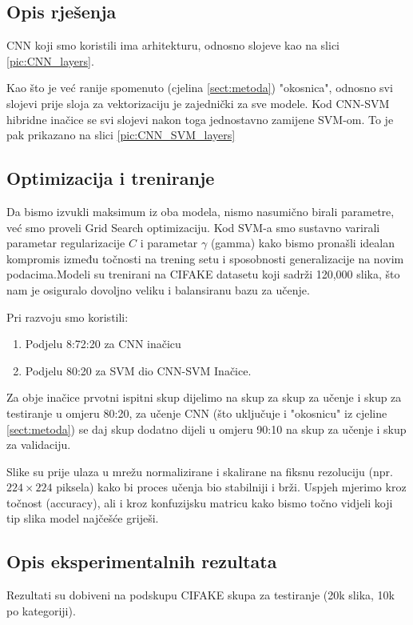 \documentclass[conference]{IEEEtran}
\begin{document}
\subsection{Opis rješenja}
CNN koji smo koristili ima arhitekturu, odnosno slojeve kao na slici \ref{pic:CNN_layers}.


Kao što je već ranije spomenuto (cjelina \ref{sect:metoda}) "okosnica", odnosno svi slojevi prije sloja za vektorizaciju je zajednički za sve modele. Kod CNN-SVM hibridne inačice se svi slojevi nakon toga jednostavno zamijene SVM-om. To je pak prikazano na slici \ref{pic:CNN_SVM_layers}

\subsection{Optimizacija i treniranje}Da bismo izvukli maksimum iz oba modela, nismo nasumično birali parametre, već smo proveli Grid Search optimizaciju. Kod SVM-a smo sustavno varirali parametar regularizacije $C$ i parametar $\gamma$ (gamma) kako bismo pronašli idealan kompromis između točnosti na trening setu i sposobnosti generalizacije na novim podacima.Modeli su trenirani na CIFAKE datasetu koji sadrži 120,000 slika, što nam je osiguralo dovoljno veliku i balansiranu bazu za učenje. 

Pri razvoju smo koristili:
\begin{enumerate}
\item Podjelu 8:72:20 za CNN inačicu
\item Podjelu 80:20 za SVM dio CNN-SVM Inačice.
\end{enumerate}
Za obje inačice prvotni ispitni skup dijelimo na skup za skup za učenje i skup za testiranje u omjeru 80:20, za učenje CNN (što uključuje i "okosnicu" iz cjeline \ref{sect:metoda}) se daj skup dodatno dijeli u omjeru 90:10 na skup za učenje i skup za validaciju.


Slike su prije ulaza u mrežu normalizirane i skalirane na fiksnu rezoluciju (npr. $224 \times 224$ piksela) kako bi proces učenja bio stabilniji i brži. Uspjeh mjerimo kroz točnost (accuracy), ali i kroz konfuzijsku matricu kako bismo točno vidjeli koji tip slika model najčešće griješi.


\subsection{Opis eksperimentalnih rezultata}
Rezultati su dobiveni na podskupu CIFAKE skupa za testiranje (20k slika, 10k po kategoriji).
\end{document}
